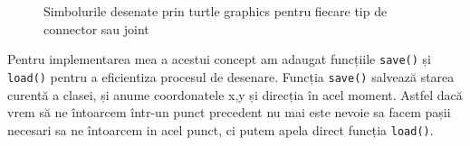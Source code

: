 \begin{figure}[H]
    \centering
    \qquad
    \caption{Simbolurile desenate prin turtle graphics pentru fiecare tip de connector sau joint}%
    \label{fig:example}%
\end{figure}


Pentru implementarea mea a acestui concept am adaugat funcțiile \verb|save()| și \verb|load()| pentru a eficientiza procesul de desenare.
Funcția \verb|save()| salvează starea curentă a clasei, și anume coordonatele x,y și direcția în acel moment. Astfel dacă vrem să ne întoarcem 
într-un punct precedent nu mai este nevoie sa facem pașii necesari sa ne întoarcem in acel punct, ci putem apela direct funcția \verb|load()|.\newline

